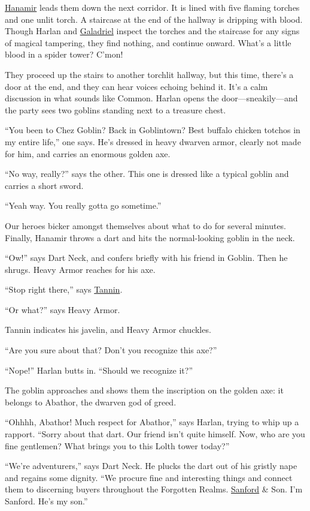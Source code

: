 \documentclass[smalldemyvopaper,11pt,twoside,onecolumn,openright,extrafontsizes]{memoir}
\begin{document}
\href{/characters/hanamir/}{Hanamir} leads them down the next corridor.
It is lined with five flaming torches and one unlit torch. A staircase
at the end of the hallway is dripping with blood. Though Harlan and
\href{/characters/galadriel/}{Galadriel} inspect the torches and the
staircase for any signs of magical tampering, they find nothing, and
continue onward. What's a little blood in a spider tower? C'mon!

They proceed up the stairs to another torchlit hallway, but this time,
there's a door at the end, and they can hear voices echoing behind it.
It's a calm discussion in what sounds like Common. Harlan opens the
door---sneakily---and the party sees two goblins standing next to a
treasure chest.

``You been to Chez Goblin? Back in Goblintown? Best buffalo chicken
totchos in my entire life,'' one says. He's dressed in heavy dwarven
armor, clearly not made for him, and carries an enormous golden axe.

``No way, really?'' says the other. This one is dressed like a typical
goblin and carries a short sword.

``Yeah way. You really gotta go sometime.''

Our heroes bicker amongst themselves about what to do for several
minutes. Finally, Hanamir throws a dart and hits the normal-looking
goblin in the neck.

``Ow!'' says Dart Neck, and confers briefly with his friend in Goblin.
Then he shrugs. Heavy Armor reaches for his axe.

``Stop right there,'' says \href{/characters/tannin/}{Tannin}.

``Or what?'' says Heavy Armor.

Tannin indicates his javelin, and Heavy Armor chuckles.

``Are you sure about that? Don't you recognize this axe?''

``Nope!'' Harlan butts in. ``Should we recognize it?''

The goblin approaches and shows them the inscription on the golden axe:
it belongs to Abathor, the dwarven god of greed.

``Ohhhh, Abathor! Much respect for Abathor,'' says Harlan, trying to
whip up a rapport. ``Sorry about that dart. Our friend isn't quite
himself. Now, who are you fine gentlemen? What brings you to this Lolth
tower today?''

``We're adventurers,'' says Dart Neck. He plucks the dart out of his
gristly nape and regains some dignity. ``We procure fine and interesting
things and connect them to discerning buyers throughout the Forgotten
Realms. \href{/characters/sanford/}{Sanford} \& Son. I'm Sanford. He's
my son.''
\end{document}
